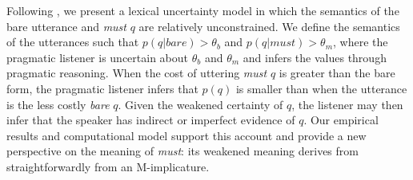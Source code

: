 \documentclass[11pt]{article}
\begin{document}
Following \cite{bergen, lassiter}, we present a lexical uncertainty model in which the semantics of the bare utterance and \textit{must} $q$ are relatively unconstrained. We define the semantics of the utterances such that $p(q | \textit{bare} ) > \theta_b$ and $p(q | \textit{must} ) > \theta_m$, where the pragmatic listener is uncertain about $\theta_b$ and $\theta_m$ and infers the values through pragmatic reasoning. When the cost of uttering \textit{must} $q$ is greater than the bare form, the pragmatic listener infers that $p(q)$ is smaller than when the utterance is the less costly \textit{bare} $q$.%
Given the weakened certainty of $q$, the listener may then infer that the speaker has indirect or imperfect evidence of $q$. Our empirical results and computational model  support this account and provide a new perspective on the meaning of \textit{must}: its weakened meaning derives from straightforwardly from an M-implicature.
%
\end{document}
